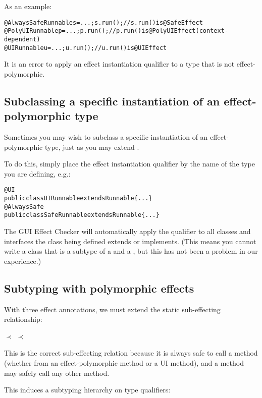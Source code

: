 As an example:

\begin{alltt}
@AlwaysSafe Runnable s = ...;    s.run();    // s.run() is @SafeEffect
@PolyUI Runnable p = ...;        p.run();    // p.run() is @PolyUIEffect (context-dependent)
@UI Runnable u = ...;            u.run();    // u.run() is @UIEffect
\end{alltt}

It is an error to apply an effect instantiation qualifier to a type that is not effect-polymorphic.

\subsection{Subclassing a specific instantiation of an effect-polymorphic type\label{guieffect-subclassing}}
Sometimes you may wish to subclass a specific instantiation of an effect-polymorphic type, just as
you may extend .

To do this, simply place the effect instantiation qualifier by the name of the type you are
defining, e.g.:

\begin{alltt}
@UI
public class UIRunnable extends Runnable \{...\}
@AlwaysSafe
public class SafeRunnable extends Runnable \{...\}
\end{alltt}
The GUI Effect Checker will automatically apply the qualifier to all classes and interfaces the class
being defined extends or implements.  (This means you cannot write a class that is a subtype of a
 and a , but this has not been a problem in our experience.)

\subsection{Subtyping with polymorphic effects\label{guieffect-subtyping}}
With three effect annotations, we must extend the static sub-effecting relationship:

\centerline{ $\prec$  $\prec$ }

\noindent
This is the correct sub-effecting relation because it is always safe to
call a 
method (whether from an effect-polymorphic method or a UI method), and a  method
may safely call any other method.

This induces a subtyping hierarchy on type qualifiers:

